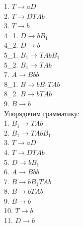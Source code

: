 \documentclass[a4paper,14pt]{extarticle}
\begin{document}
\begin{enumerate}[1.]
1. $T \rightarrow aD$\\
2. $T \rightarrow DTAb$\\
3. $T \rightarrow b$\\
4\_1. $D \rightarrow bB_1$\\
4\_2. $D \rightarrow b$\\
5\_1. $B_1 \rightarrow TAbB_1$\\
5\_2. $B_1 \rightarrow TAb$\\
7. $A \rightarrow Bbb$\\
8\_1. $B \rightarrow bB_1TAb$\\
8\_2. $B \rightarrow bTAb$\\
9. $B \rightarrow b$\\

Упорядочим грамматику:\\
1. $B_1 \rightarrow TAb$\\
2. $B_1 \rightarrow TAbB_1$\\
3. $T \rightarrow aD$\\ 
4. $T \rightarrow DTAb$\\
5. $D \rightarrow bB_1$\\
6. $A \rightarrow Bbb$\\
7. $B \rightarrow bB_1TAb$\\ 
8. $B \rightarrow bTAb$\\ 
9. $B \rightarrow b$\\
10. $T \rightarrow b$\\
11. $D \rightarrow b$\\


\end{enumerate}
\end{document}
